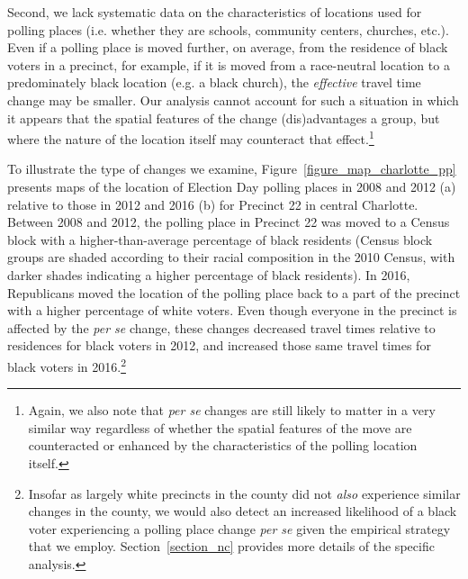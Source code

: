 \documentclass[12pt]{article}
\begin{document}
Second, we lack systematic data on the characteristics of locations used for polling places (i.e. whether they are schools, community centers, churches, etc.).  Even if a polling place is moved further, on average, from the residence of black voters in a precinct, for example, if it is moved from a race-neutral location to a predominately black location (e.g. a black church), the \emph{effective} travel time change may be smaller.  Our analysis cannot account for such a situation in which it appears that the spatial features of the change (dis)advantages a group, but where the nature of the location itself may counteract that effect.\footnote{Again, we also note that \emph{per se} changes are still likely to matter in a very similar way regardless of whether the spatial features of the move are counteracted or enhanced by the characteristics of the polling location itself.}

To illustrate the type of changes we examine, Figure~\ref{figure_map_charlotte_pp} presents maps of the location of Election Day polling places in 2008 and 2012 (a) relative to those in 2012 and 2016 (b) for Precinct 22 in central Charlotte.  Between 2008 and 2012, the polling place in Precinct 22 was moved to a Census block with a higher-than-average percentage of black residents (Census block groups are shaded according to their racial composition in the 2010 Census, with darker shades indicating a higher percentage of black residents).  In 2016, Republicans moved the location of the polling place back to a part of the precinct with a higher percentage of white voters.  Even though everyone in the precinct is affected by the \emph{per se} change, these changes decreased travel times relative to residences for black voters in 2012, and increased those same travel times for black voters in 2016.\footnote{Insofar as largely white precincts in the county did not \emph{also} experience similar changes in the county, we would also detect an increased likelihood of a black voter experiencing a polling place change \emph{per se} given the empirical strategy that we employ.  Section~\ref{section_nc} provides more details of the specific analysis.    }
\end{document}
